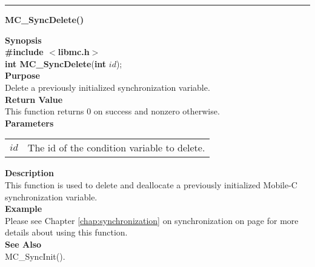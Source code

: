 \noindent
\vspace{5pt}
\rule{6.5in}{0.015in}
\noindent
{}
{\LARGE \bf MC\_SyncDelete()}\\
\label{api:MC_SyncDelete()}

\noindent
{\bf Synopsis}\\
{\bf \#include $<$libmc.h$>$}\\
{\bf int MC\_SyncDelete}({\bf int} $id$);\\

\noindent
{\bf Purpose}\\
Delete a previously initialized synchronization variable.\\

\noindent
{\bf Return Value}\\
This function returns 0 on success and nonzero otherwise.\\

\noindent
{\bf Parameters}
\vspace{-0.1in}
\begin{description}
\item
\begin{tabular}{p{10 mm}p{145 mm}} 
$id$ & The id of the condition variable to delete.
\end{tabular}
\end{description}

\noindent
{\bf Description}\\
This function is used to delete and deallocate a previously initialized 
Mobile-C synchronization variable.\\

\noindent
{\bf Example}\\
\noindent
Please see Chapter \ref{chap:synchronization} on synchronization on page
\pageref{chap:synchronization} for more details about using this function.\\

\noindent
{\bf See Also}\\
MC\_SyncInit().\\

